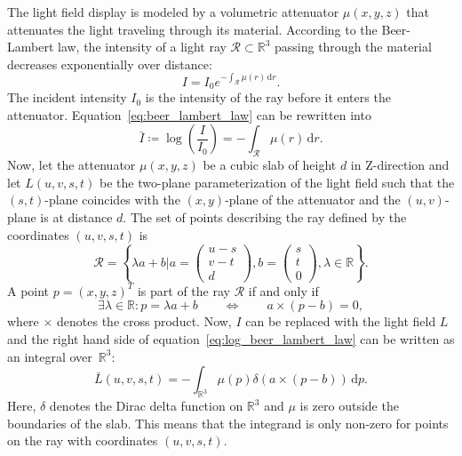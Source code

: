 The light field display is modeled by a volumetric attenuator $\mu(x, y, z)$ that attenuates the light traveling through its material.
According to the Beer-Lambert law, the intensity of a light ray $\mathcal{R} \subset \mathbb{R}^3$ passing through the material decreases exponentially over distance:
\begin{equation}\label{eq:beer_lambert_law}
	I = I_0 e^{-\int_\mathcal{R} \mu(r) \, \mathrm{d}r }.
\end{equation}
The incident intensity $I_0$ is the intensity of the ray before it enters the attenuator.
Equation~\ref{eq:beer_lambert_law} can be rewritten into 
\begin{equation}\label{eq:log_beer_lambert_law}
	\bar{I} \coloneqq \log \left( \frac{I}{I_0} \right) = -\int_\mathcal{R} \mu(r) \, \mathrm{d}r.
\end{equation} 
Now, let the attenuator $\mu(x, y, z)$ be a cubic slab of height $d$ in Z-direction and let $L(u, v, s, t)$ be the two-plane parameterization of the light field such that the $(s, t)$-plane coincides with the $(x, y)$-plane of the attenuator and the $(u, v)$-plane is at distance $d$.
The set of points describing the ray defined by the coordinates $(u, v, s, t)$ is
\begin{equation}
	\mathcal{R} = \left\{ \lambda a + b \mathrel{\bigg|} a = 
	\begin{pmatrix}
		u - s \\ 
		v - t \\ 
		d
	\end{pmatrix}, 
	b = 
	\begin{pmatrix}
		s \\ 
		t \\ 
		0
	\end{pmatrix},
	\lambda \in \mathbb{R} \right\}.
\end{equation}
A point $p = (x, y, z)^T$ is part of the ray $\mathcal{R}$ if and only if
\begin{equation}
	\exists \lambda \in \mathbb{R} : p = \lambda a + b 
	\qquad \iff \qquad 
	a \times (p - b) = 0, 
\end{equation} 
where $\times$ denotes the cross product.
Now, $I$ can be replaced with the light field $L$ and the right hand side of equation~\ref{eq:log_beer_lambert_law} can be written as an integral over~$\mathbb{R}^3$:
\begin{equation}\label{eq:log_lightfield_and_radon_transform}
	\bar{L}(u, v, s, t) = 	%
	-\int_{\mathbb{R}^3} \mu(p) \delta ( a \times (p - b) ) \, \mathrm{d}p.
\end{equation}
Here, $\delta$ denotes the Dirac delta function on $\mathbb{R}^3$ and $\mu$ is zero outside the boundaries of the slab. 
This means that the integrand is only non-zero for points on the ray with coordinates $(u, v, s, t)$.

